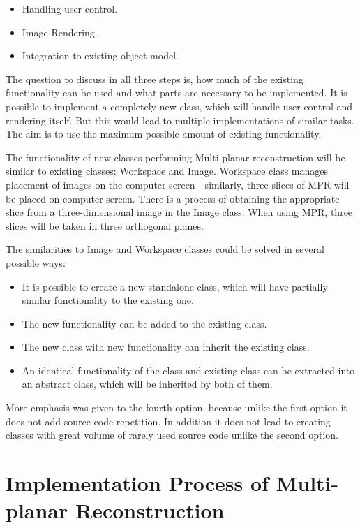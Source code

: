 \begin{itemize}
\item Handling user control.
\item Image Rendering.
\item Integration to existing object model. 
\end{itemize}

The question to discuss in all three steps is, how much of the existing functionality can be used and what parts are necessary to be implemented. It is possible to implement a completely new class, which will handle user control and rendering itself. But this would lead to multiple implementations of similar tasks. The aim is to use the maximum possible amount of existing functionality.

The functionality of new classes performing Multi-planar reconstruction will be similar to existing classes: Workspace and Image. Workspace class manages placement of images on the computer screen - similarly, three slices of MPR will be placed on computer screen. There is a process of obtaining the appropriate slice from a three-dimensional image in the Image class. When using MPR, three slices will be taken in three orthogonal planes.

The similarities to Image and Workspace classes could be solved in several possible ways:

\begin{itemize}
\item It is possible to create a new standalone class, which will have partially similar functionality to the existing one.
\item The new functionality can be added to the existing class.
\item The new class with new functionality can inherit the existing class.
\item An identical functionality of the class and existing class can be extracted into an abstract class, which will be inherited by both of them.
\end{itemize}

More emphasis was given to the fourth option, because unlike the first option it does not add source code repetition. In addition it does not lead to creating classes with great volume of rarely used source code unlike the second option.

\section{Implementation Process of Multi-planar Reconstruction}

